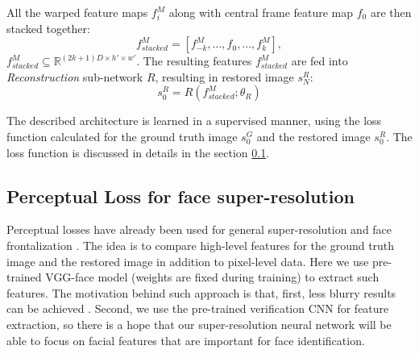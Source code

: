 All the warped feature maps $f_{i}^M$ along with central frame feature map $f_{0}$ are then stacked together:
\begin{equation}
    f_{stacked}^{M} = [f_{-k}^{M}, ...,f_{0}, ..., f_{k}^{M}],
\end{equation}
 $f_{stacked}^{M} \subseteq  \mathbb{R}^{(2k+1)D\times {h}' \times {w}'}$.
 The resulting features $f_{stacked}^{M}$ are fed into \emph{Reconstruction} sub-network $R$, resulting in restored image $s_{N}^{R}$:
 \begin{equation}
 s_{0}^{R}=R(f_{stacked}^{M}; \theta_{R})
\end{equation}

The described architecture is learned in a supervised manner, using the loss function calculated for the ground truth image $s_{0}^{G}$ and the restored image $s_{0}^{R}$. The loss function is discussed in details in the section \ref{sec:loss}.



\subsection{Perceptual Loss for face super-resolution}

\label{sec:loss}
Perceptual losses have already been used for general super-resolution \cite{JohnsonAF16} and face frontalization \cite{cole2017face}. The idea is to compare high-level features for the ground truth image and the restored image in addition to pixel-level data. Here we use pre-trained VGG-face \cite{ParkhiVZ15} model (weights are fixed during training) to extract such features. The motivation behind such approach is that, first, less blurry results can be achieved \cite{JohnsonAF16}. Second, we use the pre-trained verification CNN for feature extraction, so there is a hope that our super-resolution neural network will be able to focus on facial features that are important for face identification. 

